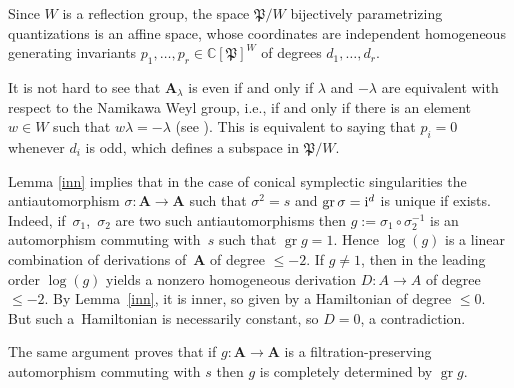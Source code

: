 Since $W$ is a reflection group, the space $\mathfrak{P}/W$ bijectively parametrizing quantizations is an affine space, whose coordinates are independent homogeneous generating invariants $p_1,\dots,p_r\in {\mathbb C}[\mathfrak{P}]^W$ of degrees $d_1,\dots,d_r$.

It is not hard to see that ${\mathbf A}_\lambda$ is even if and only if $\lambda$ and $-\lambda$ are equivalent with respect to the Namikawa Weyl group, i.e., if and only if there is an element $w\in W$ such that $w\lambda=-\lambda$ (see \cite{BPR}). This is equivalent to saying that $p_i=0$ whenever $d_i$ is odd, which defines a subspace in
$\mathfrak{P}/W$.

\begin{Remark}Lemma \ref{inn} implies that in the case of conical symplectic singularities the antiautomorphism $\sigma\colon {\mathbf A}\to {\mathbf A}$ such that $\sigma^2=s$ and $\operatorname{gr}\sigma={\rm i}^d$ is unique if exists. Indeed, if~$\sigma_1$,~$\sigma_2$ are two such antiautomorphisms then $g:=\sigma_1\circ \sigma_2^{-1}$ is an automorphism commuting with~$s$ such that $\operatorname{gr} g=1$. Hence $\log (g)$ is a linear combination of derivations of~${\mathbf A}$ of degree $\le -2$. If $g\ne 1$, then in the leading order $\log(g)$ yields a nonzero homogeneous derivation $D\colon A\to A$ of degree $\le -2$. By Lemma~\ref{inn}, it is inner, so given by a Hamiltonian of degree $\le 0$. But such a~Hamiltonian is necessarily constant, so $D=0$, a contradiction.

The same argument proves that if $g\colon {\mathbf A}\to {\mathbf A}$ is a filtration-preserving
automorphism commuting with $s$ then $g$ is completely determined by $\operatorname{gr}g$.
\end{Remark}
